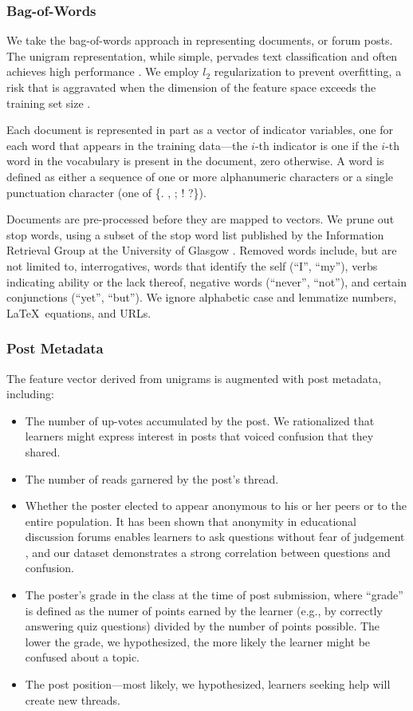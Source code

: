 \documentclass{edm_template}
\begin{document}
\subsubsection{Bag-of-Words}
We take the bag-of-words approach in representing documents, or forum posts. The unigram representation, while simple, pervades text classification and often achieves high performance \cite{boulis2005text}. We employ $l_{2}$ regularization to prevent overfitting, a risk that is aggravated when the dimension of the feature space exceeds the training set size \cite{Ng:2004:FSL:1015330.1015435}.

Each document is represented in part as a vector of indicator variables, one for each word that appears in the training data---the $i$-th indicator is one if the $i$-th word in the vocabulary is present in the document, zero otherwise. A word is defined as either a sequence of one or more alphanumeric characters or a single punctuation character (one of \{. , ; ! ?\}). 

Documents are pre-processed before they are mapped to vectors. We prune out stop words, using a subset of the stop word list published by the Information Retrieval Group at the University of Glasgow \cite{glasgow}. Removed words include, but are not limited to, interrogatives, words that identify the self (``I'', ``my''), verbs indicating ability or the lack thereof, negative words (``never'', ``not''), and certain conjunctions (``yet'', ``but''). We ignore alphabetic case and lemmatize numbers, \LaTeX\ equations, and URLs.

\subsubsection{Post Metadata}
The feature vector derived from unigrams is augmented with post metadata, including: 
\vspace{-15pt}
\begin{itemize}
\setlength\itemsep{0.05em}
       \item The number of up-votes accumulated by the post. We rationalized that learners might express interest in posts that voiced confusion that they shared. 
       \item The number of reads garnered by the post's thread.
       \item Whether the poster elected to appear anonymous to his or her peers or to the entire population. It has been shown that anonymity in educational discussion forums enables learners to ask questions without fear of judgement \cite{freeman2004student}, and our dataset demonstrates a strong correlation between questions and confusion.
       \item The poster's grade in the class at the time of post submission, where ``grade'' is defined as the numer of points earned by the learner (e.g., by correctly answering quiz questions) divided by the number of points possible. The lower the grade, we hypothesized, the more likely the learner might be confused about a topic.
       \item The post position---most likely, we hypothesized, learners seeking help will create new threads.
\end{itemize}
\end{document}
